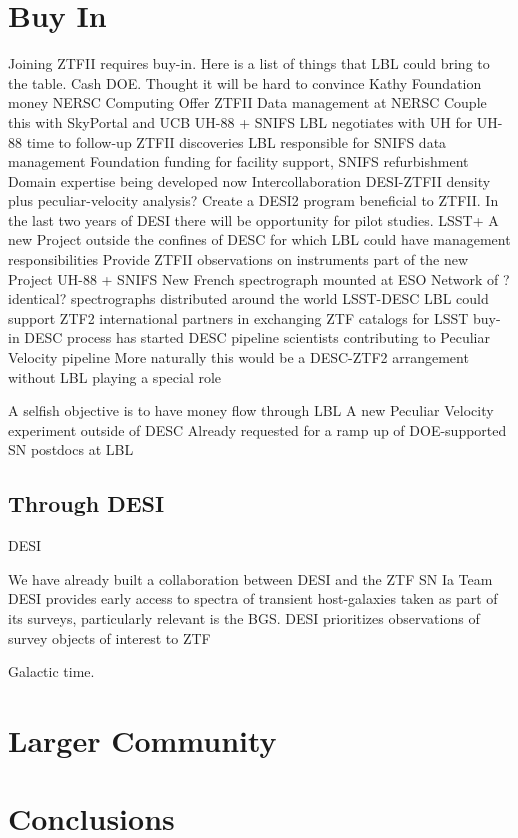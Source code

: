 \documentclass[11pt, oneside]{article}   	%
\begin{document}
\section{Buy In}



Joining ZTFII requires buy-in.  Here is a list of things that LBL could bring to the table.
Cash
DOE.  Thought it will be hard to convince Kathy
Foundation money
NERSC Computing
Offer ZTFII Data management at NERSC
Couple this with SkyPortal and UCB
UH-88 + SNIFS
LBL negotiates with UH for UH-88 time to follow-up ZTFII discoveries
LBL responsible for SNIFS data management
Foundation funding for facility support, SNIFS refurbishment
Domain expertise being developed now
Intercollaboration DESI-ZTFII density plus peculiar-velocity analysis?
Create a DESI2 program beneficial to ZTFII.   In the last two years of DESI there will be opportunity for pilot studies.
LSST+
A new Project outside the confines of DESC for which LBL could have management responsibilities
Provide ZTFII observations on instruments part of the new Project
UH-88 + SNIFS
New French spectrograph mounted at ESO
Network of ?identical? spectrographs distributed around the world
LSST-DESC
LBL could support ZTF2 international partners in exchanging ZTF catalogs for LSST buy-in
DESC process has started
DESC pipeline scientists contributing to Peculiar Velocity pipeline
More naturally this would be a DESC-ZTF2 arrangement without LBL playing a special role

A selfish objective is to have money flow through LBL
A new Peculiar Velocity experiment outside of DESC
Already requested for a ramp up of DOE-supported SN postdocs at LBL

\subsection{Through DESI}
DESI

We have already built a collaboration between DESI and the ZTF SN Ia Team
DESI provides early access to spectra of transient host-galaxies taken as part of its surveys, particularly relevant is the BGS.
DESI prioritizes observations of survey objects of interest to ZTF


Galactic time.

\section{Larger Community}

\section{Conclusions}
\end{document}
